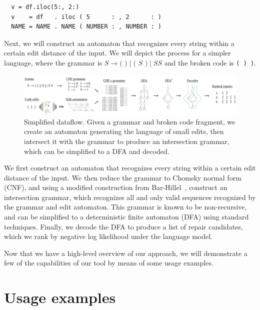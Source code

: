 \documentclass[runningheads]{llncs}
\begin{document}
\begin{verbatim}
  v = df.iloc(5:, 2:)
  v    = df   . iloc ( 5      : , 2      : )
  NAME = NAME . NAME ( NUMBER : , NUMBER : )
\end{verbatim}

\noindent Next, we will construct an automaton that recognizes every string within a certain edit distance of the input. We will depict the process for a simpler language, where the grammar is $S \rightarrow \texttt{( )} \mid \texttt{( } S \texttt{ )} \mid S S$ and the broken code is \texttt{( ) )}.\vspace{-0.3cm}

\begin{figure}[h!]
  \includegraphics[width=\textwidth]{flow.pdf}\vspace{-1pt}
  \caption{Simplified dataflow. Given a grammar and broken code fragment, we create an automaton generating the language of small edits, then intersect it with the grammar to produce an intersection grammar, which can be simplified to a DFA and decoded.}\label{fig:arch_simp}
\end{figure}\vspace{-0.3cm}

We first construct an automaton that recognizes every string within a certain edit distance of the input. We then reduce the grammar to Chomsky normal form (CNF), and using a modified construction from Bar-Hillel~\cite{bar1961formal}, construct an intersection grammar, which recognizes all and only valid sequences recognized by the grammar and edit automaton. This grammar is known to be non-recursive, and can be simplified to a deterministic finite automaton (DFA) using standard techniques. Finally, we decode the DFA to produce a list of repair candidates, which we rank by negative log likelihood under the language model.

Now that we have a high-level overview of our approach, we will demonstrate a few of the capabilities of our tool by means of some usage examples.

\section{Usage examples}
\end{document}

